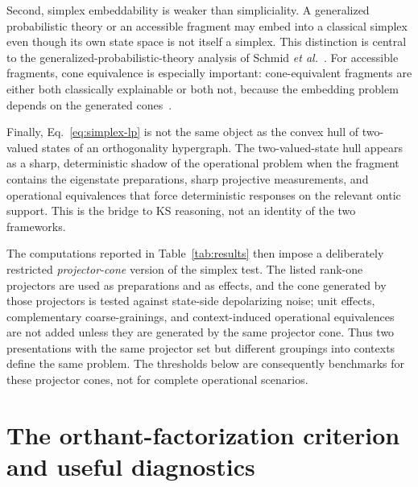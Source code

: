 \documentclass[aps,pra,twocolumn,superscriptaddress,nofootinbib]{revtex4-2}
\begin{document}
Second, simplex embeddability is weaker than simpliciality.  A generalized
probabilistic theory or an accessible fragment may embed into a classical
simplex even though its own state space is not itself a simplex.  This
distinction is central to the generalized-probabilistic-theory analysis of
Schmid \emph{et al.}~\cite{schmid-2021-simplex}.  For accessible fragments,
cone equivalence is especially important: cone-equivalent fragments are either
both classically explainable or both not, because the embedding problem depends
on the generated cones~\cite{selby-2023-fragments}.

Finally, Eq.~\eqref{eq:simplex-lp} is not the same object as the convex hull of
two-valued states of an orthogonality hypergraph.  The two-valued-state hull
appears as a sharp, deterministic shadow of the operational problem when the
fragment contains the eigenstate preparations, sharp projective measurements,
and operational equivalences that force deterministic responses on the relevant
ontic support.  This is the bridge to KS reasoning, not an identity
of the two frameworks.

The computations reported in Table~\ref{tab:results} then impose a deliberately
restricted \emph{projector-cone} version of the simplex test.  The listed
rank-one projectors are used as preparations and as effects, and the cone
generated by those projectors is tested against state-side depolarizing noise;
unit effects, complementary coarse-grainings, and context-induced operational
equivalences are not added unless they are generated by the same projector cone.
Thus two presentations with the same projector set but different groupings into
contexts define the same problem.  The thresholds below are consequently
benchmarks for these projector cones, not for complete operational scenarios.


\section{The orthant-factorization criterion and useful diagnostics}
\label{sec:sandwich}
\end{document}
